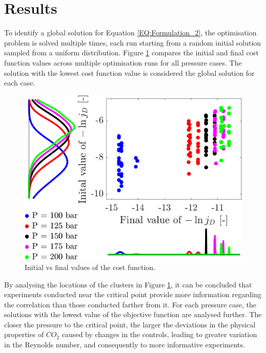 \documentclass[a4paper,fleqn]{cas-dc}
\begin{document}
		
		\section{Results}
		To identify a global solution for Equation \ref{EQ:Formulation_2}, the optimisation problem is solved multiple times, each run starting from a random initial solution sampled from a uniform distribution. Figure \ref{fig:scatter} compares the initial and final cost function values across multiple optimisation runs for all pressure cases. The solution with the lowest cost function value is considered the global solution for each case.
		
		\begin{figure}[h!]
			\centering
			\includegraphics[width=0.90\columnwidth]{Figures/Results/scatter.png}	
			\caption{Initial vs final values of the cost function.}
			\label{fig:scatter}
		\end{figure}
		
		By analysing the locations of the clusters in Figure \ref{fig:scatter}, it can be concluded that experiments conducted near the critical point provide more information regarding the correlation than those conducted farther from it. For each pressure case, the solutions with the lowest value of the objective function are analysed further. The closer the pressure to the critical point, the larger the deviations in the physical properties of $CO_2$ caused by changes in the controls, leading to greater variation in the Reynolds number, and consequently to more informative experiments. 
		
\end{document}
